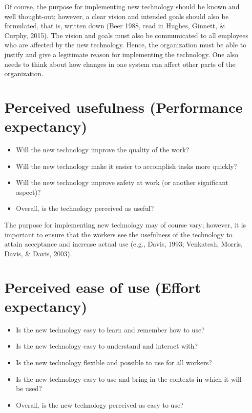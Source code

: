 \documentclass[
  12pt,
]{scrbook}
\begin{document}
Of course, the purpose for implementing new technology should be known and well thought-out; however, a clear vision and intended goals should also be formulated, that is, written down (Beer 1988, read in Hughes, Ginnett, \& Curphy, 2015). The vision and goals must also be communicated to all employees who are affected by the new technology. Hence, the organization must be able to justify and give a legitimate reason for implementing the technology. One also needs to think about how changes in one system can affect other parts of the organization.~

\hypertarget{perceived-usefulness-performance-expectancy}{%
\section*{Perceived usefulness (Performance expectancy)}\label{perceived-usefulness-performance-expectancy}}

\begin{itemize}
\item
  Will the new technology improve the quality of the work?
\item
  Will the new technology make it easier to accomplish tasks more quickly?
\item
  Will the new technology improve safety at work (or another significant aspect)?
\item
  Overall, is the technology perceived as useful?
\end{itemize}

The purpose for implementing new technology may of course vary; however, it is important to ensure that the workers see the usefulness of the technology to attain acceptance and increase actual use (e.g., Davis, 1993; Venkatesh, Morris, Davis, \& Davis, 2003).~

\hypertarget{perceived-ease-of-use-effort-expectancy}{%
\section*{Perceived ease of use (Effort expectancy)}\label{perceived-ease-of-use-effort-expectancy}}

\begin{itemize}
\item
  Is the new technology easy to learn and remember how to use?
\item
  Is the new technology easy to understand and interact with?
\item
  Is the new technology flexible and possible to use for all workers?
\item
  Is the new technology easy to use and bring in the contexts in which it will be used?
\item
  Overall, is the new technology perceived as easy to use?
\end{itemize}
\end{document}
